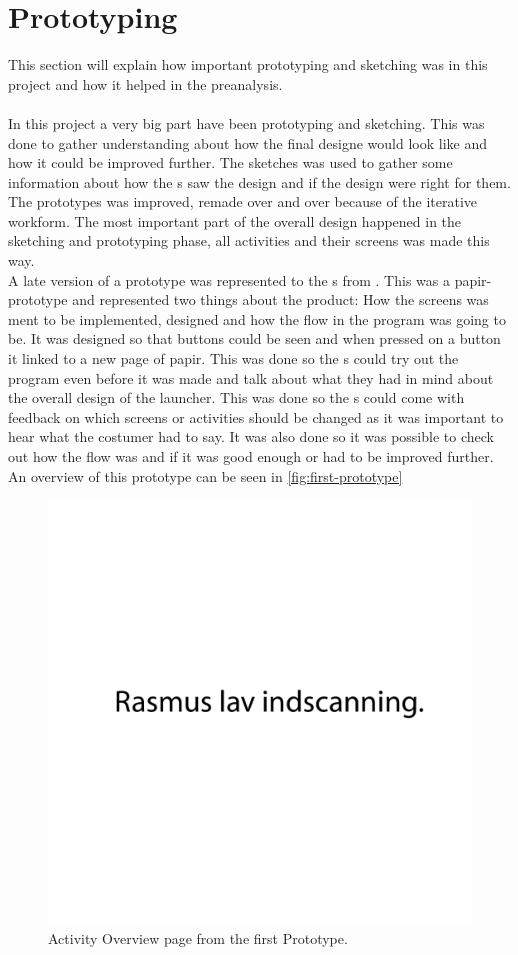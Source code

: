 \section{Prototyping}
This section will explain how important prototyping and sketching was in this project and how it helped in the preanalysis. \\\\
In this project a very big part have been prototyping and sketching. This was done to gather understanding about how the final designe would look like and how it could be improved further. The sketches was used to gather some information about how the \guardian{}s saw the design and if the design were right for them. The prototypes was improved, remade over and over because of the iterative workform. The most important part of the overall design happened in the sketching and prototyping phase, all activities and their screens was made this way. \\
A late version of a prototype was represented to the \guardian{}s from \egebakken{}. This was a papir-prototype and represented two things about the product: How the screens was ment to be implemented, designed and how the flow in the program was going to be. It was designed so that buttons could be seen and when pressed on a button it linked to a new page of papir. This was done so the \guardian{}s could try out the program even before it was made and talk about what they had in mind about the overall design of the launcher.
This was done so the \guardian{}s could come with feedback on which screens or activities should be changed as it was important to hear what the costumer had to say. It was also done so it was possible to check out how the flow was and if it was good enough or had to be improved further. An overview of this prototype can be seen in \autoref{fig:first-prototype}

\begin{figure}[h!]
	\centering
	\includegraphics[width=1\textwidth]{gfx/first-prototype.pdf}
	\caption{Activity Overview page from the first Prototype.}
	\label{fig:first-prototype}
\end{figure}


